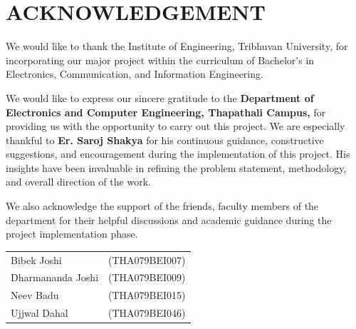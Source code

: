 \newpage
\section*{ACKNOWLEDGEMENT}  
{}

We would like to thank the Institute of Engineering, Tribhuvan University, for incorporating
our major project within the curriculum of Bachelor’s in Electronics, Communication,
and Information Engineering.

We would like to express our sincere gratitude to the \textbf{Department of Electronics
and Computer Engineering, Thapathali Campus,} for providing us with the
opportunity to carry out this project. We are especially thankful to \textbf{Er. Saroj Shakya}
for his continuous guidance, constructive suggestions, and encouragement during
the implementation of this project. His insights have been invaluable in refining
the problem statement, methodology, and overall direction of the work. 

We also acknowledge the support of the friends, faculty members of the department for their helpful
discussions and academic guidance during the project implementation phase.

\vspace{1cm}

\begin{tabular}{@{}l r@{}}
Bibek Joshi & (THA079BEI007) \\
Dharmananda Joshi & (THA079BEI009) \\
Neev Badu & (THA079BEI015) \\
Ujjwal Dahal & (THA079BEI046) \\
\end{tabular}